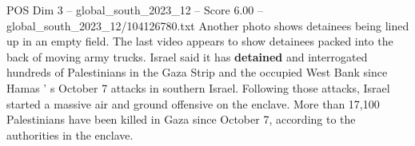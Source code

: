 \begin{textsample}{POS Dim 3 – global\_south\_2023\_12 – Score 6.00 – global\_south\_2023\_12/104126780.txt}
Another photo shows detainees being lined up in an empty field.
The last video appears to show detainees packed into the back of moving army trucks.
Israel said it has \textbf{detained} and interrogated hundreds of Palestinians in the Gaza Strip and the occupied West Bank since Hamas ' s October 7 attacks in southern Israel.
Following those attacks, Israel started a massive air and ground offensive on the enclave.
More than 17,100 Palestinians have been killed in Gaza since October 7, according to the authorities in the enclave.

\end{textsample}

